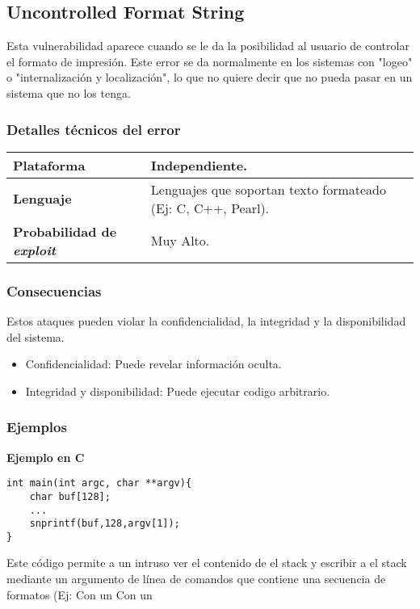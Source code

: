 \subsection{Uncontrolled Format String}

Esta vulnerabilidad aparece cuando se le da la posibilidad al usuario de controlar el formato de impresión.
Este error se da normalmente en los sistemas con "logeo" o "internalización y localización", lo que no quiere decir que no pueda pasar en un sistema que no los tenga.


\subsubsection{Detalles técnicos del error}
\begin{tabular}[\baselineskip]{|l|p{7cm}|}
  \hline
  \textbf{Plataforma} & Independiente. \\
  \hline
  \textbf{Lenguaje} & Lenguajes que soportan texto formateado (Ej: C, C++, Pearl). \\
  \hline
  \textbf{Probabilidad de \emph{exploit}} & Muy Alto. \\
  \hline
\end{tabular}

\subsubsection{Consecuencias}

Estos ataques pueden violar la confidencialidad, la integridad y la disponibilidad del sistema.

\begin{itemize}
 \item Confidencialidad: Puede revelar información oculta. 
 \item Integridad y disponibilidad: Puede ejecutar codigo arbitrario.
\end{itemize}


\subsubsection{Ejemplos}

\noindent \textbf{Ejemplo en C}\\

\begin{lstlisting}[frame=single]
int main(int argc, char **argv){
	char buf[128];
	...
	snprintf(buf,128,argv[1]);
}
\end{lstlisting}
Este código permite a un intruso ver el contenido de el stack y escribir a el stack mediante un argumento de línea de 
comandos que contiene una secuencia de formatos (Ej: %
Con un %
Con un %

